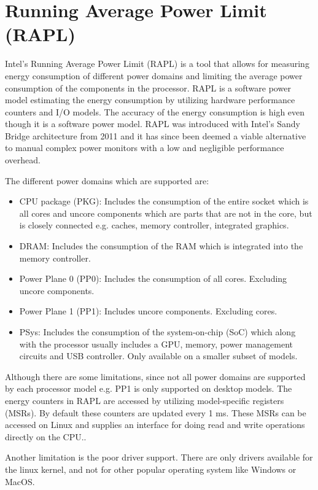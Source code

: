 \section{Running Average Power Limit (RAPL)}
Intel's Running Average Power Limit (RAPL) is a tool that allows for measuring energy consumption of different power domains and  limiting the average power consumption of the components in the processor. RAPL is a software power model estimating the energy consumption by utilizing hardware performance counters and I/O models.\cite{Power-Management_Sandy_Bridge} The accuracy of the energy consumption is  high even though it is a software power model\cite{RAPL_ACU1,RAPL_ACU2}. RAPL was introduced with Intel's Sandy Bridge architecture from 2011 and it has since  been deemed a viable alternative to manual complex power monitors with a low and negligible performance overhead. \cite{RAPL_in_action}

The different power domains which are supported are:
\begin{itemize}
    \item CPU package (PKG): Includes the consumption of the entire socket which is all cores and uncore components which are parts that are not in the core, but is closely connected e.g. caches, memory controller, integrated graphics.
    \item DRAM: Includes the consumption of the RAM which is integrated into the memory controller.  
    \item Power Plane 0 (PP0): Includes the consumption of all cores. Excluding uncore components.
    \item Power Plane 1 (PP1): Includes uncore components. Excluding cores.
    \item PSys: Includes the consumption of the system-on-chip (SoC) which along with the processor usually includes a GPU, memory, power management circuits and USB controller. Only available on a smaller subset of models.
\end{itemize}

Although there are some limitations, since not all power domains are supported by each processor model e.g. PP1 is only supported on desktop models. The energy counters in RAPL are accessed by utilizing model-specific registers (MSRs). By default these counters are updated every 1 ms. These MSRs can be accessed on Linux and supplies an interface for doing read and write operations directly on the CPU.\cite{linux_manual_msr}.\nytafsnit

Another limitation is the poor driver support. There are only drivers available for the linux kernel, and not for other popular operating system like Windows or MacOS.\cite{RAPL_in_action}  

